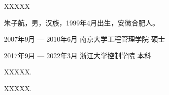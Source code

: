 \documentclass[master,oneside,winfonts]{njuthesis/njuthesis}
\begin{document}
\begin{acknowledgement}
    XXXXX
\end{acknowledgement}


\nocite{*}
\begin{spacing}{0.2}
    
\end{spacing}


\begin{resume}
    \begin{authorinfo}
        \noindent 朱子航，男，汉族，1999年4月出生，安徽合肥人。
    \end{authorinfo}
    \begin{education}
    \item[2007年9月 --- 2010年6月] 南京大学工程管理学院 \hfill 硕士
    \item[2017年9月 --- 2022年3月] 浙江大学控制学院 \hfill 本科
    \end{education}
    \begin{publications}
        \item XXXXX.
        \item XXXXX.
    \end{publications}
\end{resume}



\end{document}

